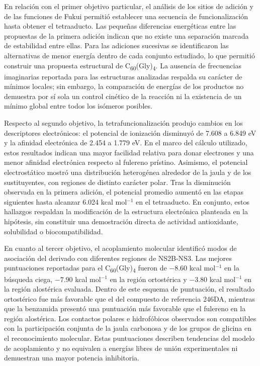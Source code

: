 \begin{table}[htbp]
En relación con el primer objetivo particular, el análisis de los sitios de adición y de las funciones de Fukui permitió establecer una secuencia de funcionalización hasta obtener el tetraaducto. Las pequeñas diferencias energéticas entre las propuestas de la primera adición indican que no existe una separación marcada de estabilidad entre ellas. Para las adiciones sucesivas se identificaron las alternativas de menor energía dentro de cada conjunto estudiado, lo que permitió construir una propuesta estructural de C\textsubscript{60}(Gly)\textsubscript{4}. La ausencia de frecuencias imaginarias reportada para las estructuras analizadas respalda su carácter de mínimos locales; sin embargo, la comparación de energías de los productos no demuestra por sí sola un control cinético de la reacción ni la existencia de un mínimo global entre todos los isómeros posibles.

Respecto al segundo objetivo, la tetrafuncionalización produjo cambios en los descriptores electrónicos: el potencial de ionización disminuyó de 7.608 a 6.849 eV y la afinidad electrónica de 2.454 a 1.779 eV. En el marco del cálculo utilizado, estos resultados indican una mayor facilidad relativa para donar electrones y una menor afinidad electrónica respecto al fulereno prístino. Asimismo, el potencial electrostático mostró una distribución heterogénea alrededor de la jaula y de los sustituyentes, con regiones de distinto carácter polar. Tras la disminución observada en la primera adición, el potencial promedio aumentó en las etapas siguientes hasta alcanzar 6.024 kcal mol$^{-1}$ en el tetraaducto. En conjunto, estos hallazgos respaldan la modificación de la estructura electrónica planteada en la hipótesis, sin constituir una demostración directa de actividad antioxidante, solubilidad o biocompatibilidad.

En cuanto al tercer objetivo, el acoplamiento molecular identificó modos de asociación del derivado con diferentes regiones de NS2B-NS3. Las mejores puntuaciones reportadas para el C\textsubscript{60}(Gly)\textsubscript{4} fueron de $-8.60$ kcal mol$^{-1}$ en la búsqueda ciega, $-7.90$ kcal mol$^{-1}$ en la región ortostérica y $-3.80$ kcal mol$^{-1}$ en la región alostérica evaluada. Dentro de este esquema de puntuación, el resultado ortostérico fue más favorable que el del compuesto de referencia 246DA, mientras que la benzamida presentó una puntuación más favorable que el fulereno en la región alostérica. Los contactos polares e hidrofóbicos observados son compatibles con la participación conjunta de la jaula carbonosa y de los grupos de glicina en el reconocimiento molecular. Estas puntuaciones describen tendencias del modelo de acoplamiento y no equivalen a energías libres de unión experimentales ni demuestran una mayor potencia inhibitoria.


\end{table}

